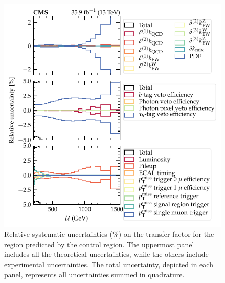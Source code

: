 \begin{figure}
    \centering
    \includegraphics{chapters/042_backgrounds/images/tf_wj_ele_met_systs1.pdf}
    \caption[Theoretical uncertainty on the transfer factors]{
        Relative systematic uncertainties (\%) on the \IWj transfer factor for the \metplusjets region predicted by the \eleplusjets control region. The uppermost panel includes all the theoretical uncertainties, while the others include experimental uncertainties. The total uncertainty, depicted in each panel, represents all uncertainties summed in quadrature.
    }
    \label{fig:tf-systs-eleplusjets-1}
\end{figure}
%
